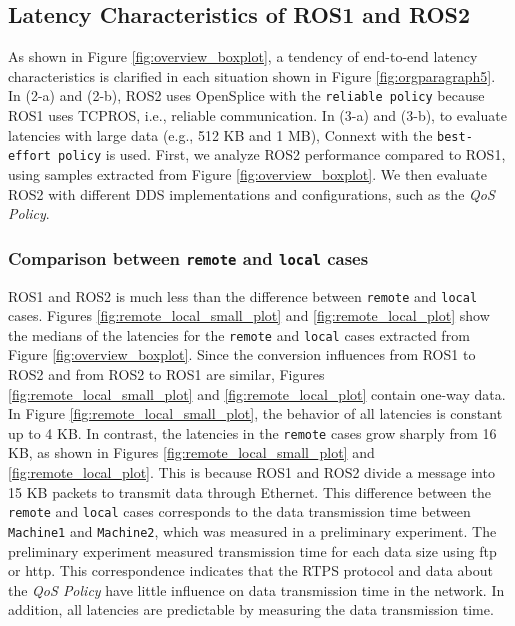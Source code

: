\documentclass{sig-alternate-05-2015}
\begin{document}
\subsection{Latency Characteristics of ROS1 and ROS2}
\label{sec:latency}

As shown in Figure \ref{fig:overview_boxplot}, a tendency of end-to-end latency characteristics is clarified in each situation shown in Figure \ref{fig:orgparagraph5}.
In (2-a) and (2-b), ROS2 uses OpenSplice with the \texttt{reliable policy}  because ROS1 uses TCPROS, i.e., reliable communication.
In (3-a) and (3-b), to evaluate latencies with large data (e.g., 512 KB and 1 MB), Connext with the \texttt{best-effort policy} is used.
First, we analyze ROS2 performance compared to ROS1, using samples extracted from Figure \ref{fig:overview_boxplot}.
We then evaluate ROS2 with different DDS implementations and configurations, such as the \emph{QoS Policy}.

\subsubsection{Comparison between \texttt{remote} and \texttt{local} cases}
\label{sec:remote_local}
ROS1 and ROS2 is much less than the difference between \texttt{remote} and \texttt{local} cases.
Figures \ref{fig:remote_local_small_plot} and \ref{fig:remote_local_plot} show the medians of the latencies for the \texttt{remote} and \texttt{local} cases extracted from Figure \ref{fig:overview_boxplot}.
Since the conversion influences from ROS1 to ROS2 and from ROS2 to ROS1 are similar, Figures \ref{fig:remote_local_small_plot} and \ref{fig:remote_local_plot} contain one-way data.
In Figure \ref{fig:remote_local_small_plot}, the behavior of all latencies is constant up to 4 KB.
In contrast, the latencies in the \texttt{remote} cases grow sharply from 16 KB, as shown in Figures \ref{fig:remote_local_small_plot} and \ref{fig:remote_local_plot}.
This is because ROS1 and ROS2 divide a message into 15 KB packets to transmit data through Ethernet.
This difference between the \texttt{remote} and \texttt{local} cases corresponds to the data transmission time between \texttt{Machine1} and \texttt{Machine2}, which was measured in a preliminary experiment. The preliminary experiment measured transmission time for each data size using ftp or http.
This correspondence indicates that the RTPS protocol and data about the \emph{QoS Policy} have little influence on data transmission time in the network.
In addition, all latencies are predictable by measuring the data transmission time.
\end{document}
